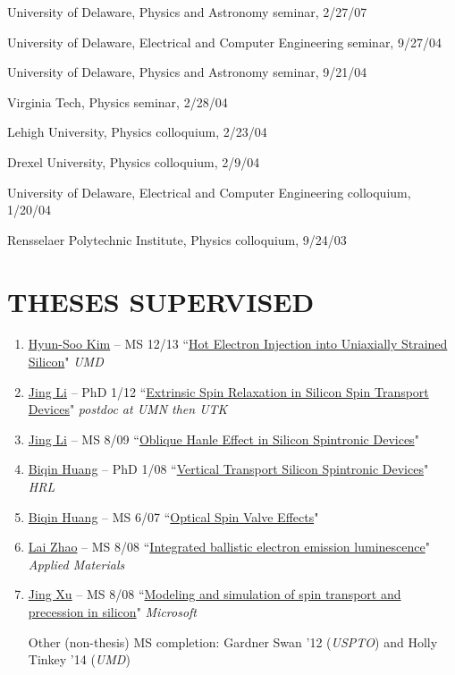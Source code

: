 \documentclass[paper=letter,fontsize=11pt]{scrartcl} %
\newcommand{\NewPart}[2]{\section*{\uppercase{#1} #2}}
\newcommand{\TalkEntry}[4]{
		\noindent #1, #2, #3 #4}
\newcommand{\ThesisEntry}[5]{
		\noindent #1 -- #2 #3 ``#4" \textit{#5}}
\begin{document}
\begin{etaremune}
\item\TalkEntry{University of Delaware}{Physics and Astronomy seminar}{2/27/07}{}
\item\TalkEntry{University of Delaware}{Electrical and Computer Engineering seminar}{9/27/04}{}
\item\TalkEntry{University of Delaware}{Physics and Astronomy seminar}{9/21/04}{}
\item\TalkEntry{Virginia Tech}{Physics seminar}{2/28/04}{}
\item\TalkEntry{Lehigh University}{Physics colloquium}{2/23/04}{}
\item\TalkEntry{Drexel University}{Physics colloquium}{2/9/04}{}
\item\TalkEntry{University of Delaware}{Electrical and Computer Engineering colloquium}{1/20/04}{}
\item\TalkEntry{Rensselaer Polytechnic Institute}{Physics colloquium}{9/24/03}{}
\end{etaremune}

\NewPart{Theses Supervised}{}
\begin{enumerate}
\item\ThesisEntry{\href{http://www.linkedin.com/pub/hyun-soo-kim/48/28/191}{Hyun-Soo Kim}}{MS}{12/13}{\href{http://drum.lib.umd.edu/handle/1903/15485}{Hot Electron Injection into Uniaxially Strained Silicon}}{UMD}
\item\ThesisEntry{\href{https://www.linkedin.com/pub/jing-li/3b/34/945}{Jing Li}}{PhD}{1/12}{\href{http://phdtree.org/pdf/25957408-extrinsic-spin-relaxation-in-silicon-spin-transport-devices/}{Extrinsic Spin Relaxation in Silicon Spin Transport Devices}}{postdoc at UMN then UTK}
\item\ThesisEntry{\href{https://www.linkedin.com/pub/jing-li/3b/34/945}{Jing Li}}{MS}{8/09}{\href{http://gradworks.umi.com/14/69/1469530.html}{Oblique Hanle Effect in Silicon Spintronic Devices}}{}
\item\ThesisEntry{\href{http://www.linkedin.com/pub/biqin-huang/a/21/1a4}{Biqin Huang}}{PhD}{1/08}{\href{http://gradworks.umi.com/32/96/3296631.html}{Vertical Transport Silicon Spintronic Devices}}{HRL} 
\item\ThesisEntry{\href{http://www.linkedin.com/pub/biqin-huang/a/21/1a4}{Biqin Huang}}{MS}{6/07}{\href{http://gradworks.umi.com/14/44/1444640.html}{Optical Spin Valve Effects}}{}
\item\ThesisEntry{\href{http://www.linkedin.com/pub/dir/Lai/Zhao}{Lai Zhao}}{MS}{8/08}{\href{http://gradworks.umi.com/14/57/1457436.html}{Integrated ballistic electron emission luminescence}}{Applied Materials}
\item\ThesisEntry{\href{https://www.linkedin.com/in/jingxu1}{Jing Xu}}{MS}{8/08}{\href{http://gradworks.umi.com/14/57/1457437.html}{Modeling and simulation of spin transport and precession in silicon}}{Microsoft}

Other (non-thesis) MS completion: Gardner Swan '12 (\emph{USPTO}) and Holly Tinkey '14 (\emph{UMD})
\end{enumerate}
\end{document}
